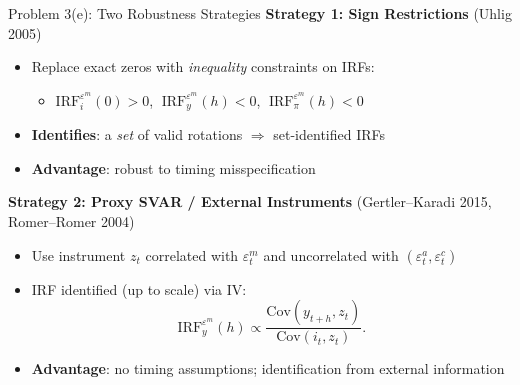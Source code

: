 \documentclass[aspectratio=169,11pt]{beamer}
\newcommand{\Cov}{\text{Cov}}
\begin{document}
\begin{frame}{Problem 3(e): Two Robustness Strategies}
    \textbf{Strategy 1: Sign Restrictions} \textcolor{mitred}{(Uhlig 2005)}
    \begin{itemize}
        \item Replace exact zeros with \textit{inequality} constraints on IRFs:
        \begin{itemize}
            \item $\text{IRF}_i^{\varepsilon^m}(0) > 0$, $\;\text{IRF}_y^{\varepsilon^m}(h) < 0$, $\;\text{IRF}_\pi^{\varepsilon^m}(h) < 0$
        \end{itemize}
        \item \textbf{Identifies}: a \textit{set} of valid rotations $\Rightarrow$ set-identified IRFs
        \item \textbf{Advantage}: robust to timing misspecification
    \end{itemize}

    \vspace{0.4em}
    \textbf{Strategy 2: Proxy SVAR / External Instruments} \textcolor{mitred}{(Gertler--Karadi 2015, Romer--Romer 2004)}
    \begin{itemize}
        \item Use instrument $z_t$ correlated with $\varepsilon_t^m$ and uncorrelated with $(\varepsilon_t^a, \varepsilon_t^c)$
        \item IRF identified (up to scale) via IV:
        \[
        \text{IRF}_y^{\varepsilon^m}(h) \propto \frac{\Cov(y_{t+h}, z_t)}{\Cov(i_t, z_t)}.
        \]
        \item \textbf{Advantage}: no timing assumptions; identification from external information
    \end{itemize}
\end{frame}
\end{document}
